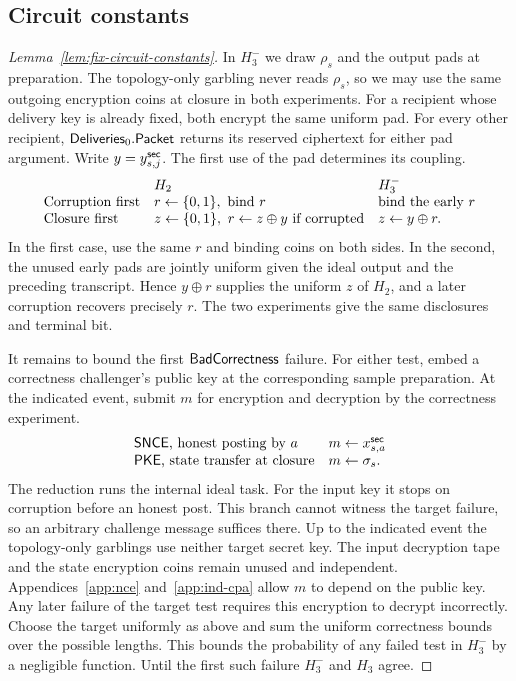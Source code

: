 \subsection{Circuit constants}
\label{sec:constants-hybrid-proof}
\begin{proof}[Lemma~\ref{lem:fix-circuit-constants}]
In $H_3^-$ we draw $\rho_s$ and the output pads at preparation.
The topology-only garbling never reads $\rho_s$, so we may use the
same outgoing encryption coins at closure in both experiments.
For a recipient whose delivery key is already fixed, both encrypt the
same uniform pad.  For every other recipient, $\mathsf{Deliveries}_0.\mathsf{Packet}$
returns its reserved ciphertext for either pad argument.
Write $y=y^{\mathsf{sec}}_{s,j}$. The first use of the pad determines its coupling.
\[
 \begin{array}{@{}l@{\quad}l@{\quad}l@{}}
   & H_2 & H_3^- \\
 \text{Corruption first} & r\sample\bits,\ \text{bind }r
                         & \text{bind the early }r\\
 \text{Closure first} & z\sample\bits,\ r\gets z\oplus y\text{ if corrupted}
                      & z\gets y\oplus r .
 \end{array}
\]
In the first case, use the same $r$ and binding coins on both sides.
In the second, the unused early pads are jointly uniform given the
ideal output and the preceding transcript.  Hence $y\oplus r$ supplies
the uniform $z$ of $H_2$, and a later corruption recovers precisely $r$.
The two experiments give the same disclosures and terminal bit.

It remains to bound the first $\mathsf{BadCorrectness}$ failure.  For either
test, embed a correctness challenger's public key at the corresponding
sample preparation.  At the indicated event, submit $m$ for encryption
and decryption by the correctness experiment.
\[
 \begin{array}{@{}l@{\quad}l@{}}
 \SNCE\text{, honest posting by }a & m\gets\xsec_{s,a}\\
 \PKE\text{, state transfer at closure} & m\gets\sigma_s .
 \end{array}
\]
The reduction runs the internal ideal task.  For the input key it stops
on corruption before an honest post.  This branch cannot witness the
target failure, so an arbitrary challenge message suffices there.
Up to the indicated event the topology-only garblings use neither
target secret key.  The input decryption tape and the state encryption
coins remain unused and independent.
Appendices~\ref{app:nce} and~\ref{app:ind-cpa} allow $m$ to depend on the
public key.  Any later failure of the target test requires this
encryption to decrypt incorrectly.  Choose the target uniformly as
above and sum the uniform correctness bounds over the possible lengths.
This bounds the probability of any failed test in $H_3^-$ by a
negligible function.  Until the first such failure $H_3^-$ and $H_3$ agree.
\end{proof}

